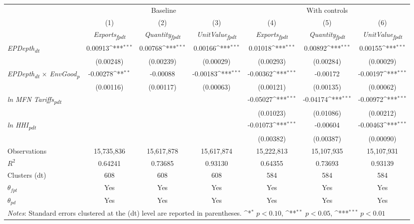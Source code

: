 {
\def\sym#1{\ifmmode^{#1}\else\(^{#1}\)\fi}
\begin{tabular}{l*{6}{c}}
\toprule
&\multicolumn{3}{c}{Baseline}&\multicolumn{3}{c}{With controls}\\\cmidrule(lr){2-4}\cmidrule(lr){5-7}
&(1)&(2)&(3)&(4)&(5)&(6)\\
&\textit{Exports\textsubscript{fpdt}}&\textit{Quantity\textsubscript{fpdt}}&\textit{UnitValue\textsubscript{fpdt}}&\textit{Exports\textsubscript{fpdt}}&\textit{Quantity\textsubscript{fpdt}}&\textit{UnitValue\textsubscript{fpdt}}\\
\midrule
\textit{EPDepth\textsubscript{dt}} & 0.00913\sym{***} & 0.00768\sym{***} & 0.00166\sym{***} & 0.01018\sym{***} & 0.00892\sym{***} & 0.00155\sym{***}\\
 & (0.00248) & (0.00239) & (0.00029) & (0.00293) & (0.00284) & (0.00029)\\
\addlinespace
\textit{EPDepth\textsubscript{dt} $\times$ EnvGood\textsubscript{p}} & -0.00278\sym{**} & -0.00088 & -0.00183\sym{***} & -0.00362\sym{***} & -0.00172 & -0.00197\sym{***}\\
 & (0.00116) & (0.00117) & (0.00063) & (0.00121) & (0.00135) & (0.00062)\\
\addlinespace
\textit{ln MFN Tariffs\textsubscript{pdt}} &  &  &  & -0.05027\sym{***} & -0.04174\sym{***} & -0.00972\sym{***}\\
 &  &  &  & (0.01023) & (0.01086) & (0.00212)\\
\addlinespace
\textit{ln HHI\textsubscript{pdt}} &  &  &  & -0.01073\sym{***} & -0.00604 & -0.00463\sym{***}\\
 &  &  &  & (0.00382) & (0.00387) & (0.00090)\\
\midrule
Observations & 15,735,836 & 15,617,878 & 15,617,874 & 15,222,813 & 15,107,935 & 15,107,931\\
$R^{2}$ & 0.64241 & 0.73685 & 0.93130 & 0.64355 & 0.73693 & 0.93139\\
Clusters (dt) & 608 & 608 & 608 & 584 & 584 & 584\\
$\theta_{fpt}$ & Yes & Yes & Yes & Yes & Yes & Yes\\
$\theta_{pd}$ & Yes & Yes & Yes & Yes & Yes & Yes\\
\bottomrule
\multicolumn{7}{l}{\footnotesize \textit{Notes}: Standard errors clustered at the (dt) level are reported in parentheses. \sym{*} \(p<0.10\), \sym{**} \(p<0.05\), \sym{***} \(p<0.01\)}\\
\end{tabular}
}
